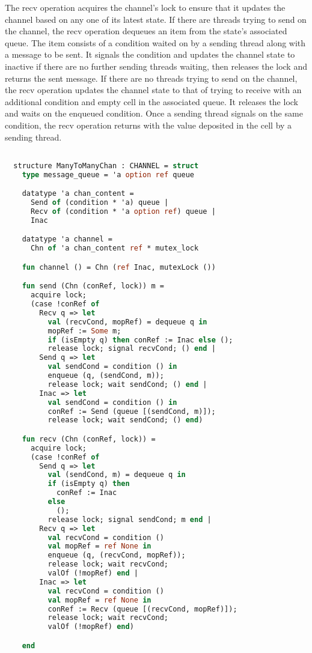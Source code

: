 \documentclass{article}
\begin{document}
The recv operation acquires the channel's lock to ensure that it updates the channel based on
any one of its latest state.  If there are threads trying to send on the channel, the recv
operation dequeues an item from the state's associated queue.  The item consists of a condition
waited on by a sending thread along with a message to be sent.  It signals the condition and
updates the channel state to inactive if there are no further sending threads waiting, then
releases the lock and returns the sent message.  If there are no threads trying to send on the
channel, the recv operation updates the channel state to that of trying to receive with an
additional condition and empty cell in the associated queue.  It releases the lock and waits on
the enqueued condition.  Once a sending thread signals on the same condition, the recv
operation returns with the value deposited in the cell by a sending thread.

\begin{lstlisting}[language=ML, escapechar=\%]

  structure ManyToManyChan : CHANNEL = struct
    type message_queue = 'a option ref queue

    datatype 'a chan_content = 
      Send of (condition * 'a) queue | 
      Recv of (condition * 'a option ref) queue | 
      Inac

    datatype 'a channel =
      Chn of 'a chan_content ref * mutex_lock 

    fun channel () = Chn (ref Inac, mutexLock ())

    fun send (Chn (conRef, lock)) m = 
      acquire lock;
      (case !conRef of
        Recv q => let
          val (recvCond, mopRef) = dequeue q in
          mopRef := Some m;
          if (isEmpty q) then conRef := Inac else (); 
          release lock; signal recvCond; () end |
        Send q => let
          val sendCond = condition () in
          enqueue (q, (sendCond, m));
          release lock; wait sendCond; () end |
        Inac => let
          val sendCond = condition () in
          conRef := Send (queue [(sendCond, m)]);
          release lock; wait sendCond; () end)

    fun recv (Chn (conRef, lock)) =  
      acquire lock;
      (case !conRef of 
        Send q => let
          val (sendCond, m) = dequeue q in
          if (isEmpty q) then
            conRef := Inac
          else
            (); 
          release lock; signal sendCond; m end |
        Recv q => let
          val recvCond = condition ()
          val mopRef = ref None in
          enqueue (q, (recvCond, mopRef));
          release lock; wait recvCond;
          valOf (!mopRef) end |
        Inac => let
          val recvCond = condition ()
          val mopRef = ref None in
          conRef := Recv (queue [(recvCond, mopRef)]);
          release lock; wait recvCond;
          valOf (!mopRef) end)

    end

  \end{lstlisting}
\end{document}
